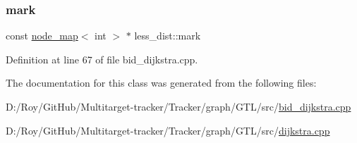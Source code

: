 \mbox{\label{classless__dist_a7905c2d559b1b629175fc810c643375c}} 
\subsubsection{\texorpdfstring{mark}{mark}}
{\footnotesize\ttfamily const \mbox{\hyperlink{classnode__map}{node\+\_\+map}}$<$ int $>$ $\ast$ less\+\_\+dist\+::mark\hspace{0.3cm}{\ttfamily [private]}}



Definition at line 67 of file bid\+\_\+dijkstra.\+cpp.



The documentation for this class was generated from the following files\+:\begin{DoxyCompactItemize}
\item 
D\+:/\+Roy/\+Git\+Hub/\+Multitarget-\/tracker/\+Tracker/graph/\+G\+T\+L/src/\mbox{\hyperlink{bid__dijkstra_8cpp}{bid\+\_\+dijkstra.\+cpp}}\item 
D\+:/\+Roy/\+Git\+Hub/\+Multitarget-\/tracker/\+Tracker/graph/\+G\+T\+L/src/\mbox{\hyperlink{dijkstra_8cpp}{dijkstra.\+cpp}}\end{DoxyCompactItemize}
